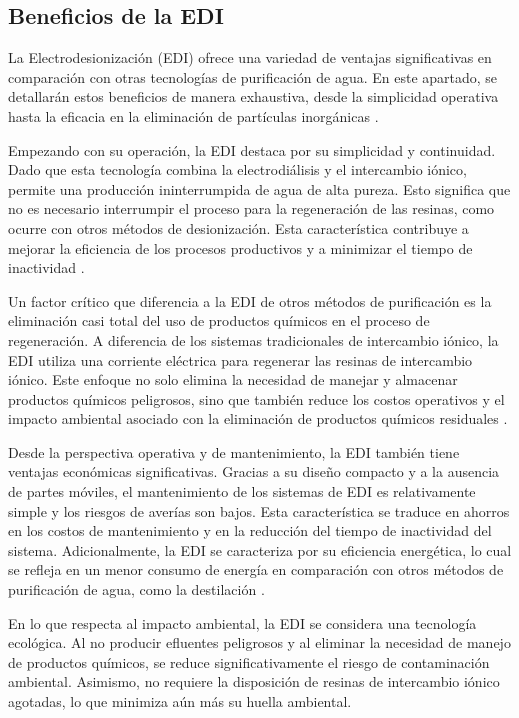 \subsection{Beneficios de la EDI}
La Electrodesionización (EDI) ofrece una variedad de ventajas significativas en comparación con otras tecnologías de
purificación de agua. En este apartado, se detallarán estos beneficios de manera exhaustiva, desde la simplicidad operativa
hasta la eficacia en la eliminación de partículas inorgánicas \cite{condorchemUltrapureWaterElectrodeionization2019}.

Empezando con su operación, la EDI destaca por su simplicidad y continuidad. Dado que esta tecnología combina la electrodiálisis
y el intercambio iónico, permite una producción ininterrumpida de agua de alta pureza. Esto significa que no es necesario
interrumpir el proceso para la regeneración de las resinas, como ocurre con otros métodos de desionización. Esta característica
contribuye a mejorar la eficiencia de los procesos productivos y a minimizar el tiempo de inactividad \cite{lenntechElectrodeionizationEDI}.

Un factor crítico que diferencia a la EDI de otros métodos de purificación es la eliminación casi total del uso de productos
químicos en el proceso de regeneración. A diferencia de los sistemas tradicionales de intercambio iónico, la EDI utiliza una
corriente eléctrica para regenerar las resinas de intercambio iónico. Este enfoque no solo elimina la necesidad de manejar
y almacenar productos químicos peligrosos, sino que también reduce los costos operativos y el impacto ambiental asociado con
la eliminación de productos químicos residuales \cite{lenntechElectrodeionizationEDI}.

Desde la perspectiva operativa y de mantenimiento, la EDI también tiene ventajas económicas significativas. Gracias a su
diseño compacto y a la ausencia de partes móviles, el mantenimiento de los sistemas de EDI es relativamente simple y los
riesgos de averías son bajos. Esta característica se traduce en ahorros en los costos de mantenimiento y en la reducción
del tiempo de inactividad del sistema. Adicionalmente, la EDI se caracteriza por su eficiencia energética, lo cual se refleja
en un menor consumo de energía en comparación con otros métodos de purificación de agua, como la destilación \cite{lenntechElectrodeionizationEDI}.

En lo que respecta al impacto ambiental, la EDI se considera una tecnología ecológica. Al no producir efluentes peligrosos y
al eliminar la necesidad de manejo de productos químicos, se reduce significativamente el riesgo de contaminación ambiental.
Asimismo, no requiere la disposición de resinas de intercambio iónico agotadas, lo que minimiza aún más su huella ambiental.

